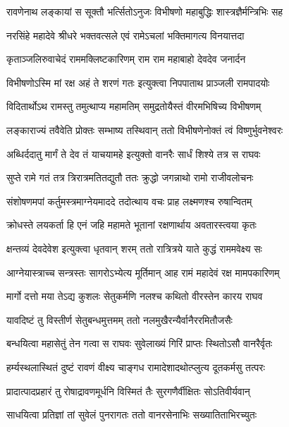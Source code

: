 \twolineshloka
{रावणेनाथ लङ्कायां स सूक्तौ भर्त्सितोऽनुजः}
{विभीषणो महाबुद्धिः शास्त्रज्ञैर्मन्त्रिभिः सह} %

\twolineshloka
{नरसिंहे महादेवे श्रीधरे भक्तवत्सले}
{एवं रामेऽचलां भक्तिमागत्य विनयात्तदा} %

\twolineshloka
{कृताञ्जलिरुवाचेदं राममक्लिष्टकारिणम्}
{राम राम महाबाहो देवदेव जनार्दन} %

\twolineshloka
{विभीषणोऽस्मि मां रक्ष अहं ते शरणं गतः}
{इत्युक्त्वा निपपाताथ प्राञ्जली रामपादयोः} %

\twolineshloka
{विदितार्थोऽथ रामस्तु तमुत्थाप्य महामतिम्}
{समुद्रतोयैस्तं वीरमभिषिच्य विभीषणम्} %

\twolineshloka
{लङ्काराज्यं तवैवेति प्रोक्तः सम्भाष्य तस्थिवान्}
{ततो विभीषणेनोक्तं त्वं विष्णुर्भुवनेश्वरः} %

\twolineshloka
{अब्धिर्ददातु मार्गं ते देव तं याचयामहे}
{इत्युक्तो वानरैः सार्धं शिश्ये तत्र स राघवः} %

\twolineshloka
{सुप्ते रामे गतं तत्र त्रिरात्रमतितद्युतौ}
{ततः क्रुद्धो जगन्नाथो रामो राजीवलोचनः} %

\twolineshloka
{संशोषणमपां कर्तुमस्त्रमाग्नेयमाददे}
{तदोत्थाय वचः प्राह लक्ष्मणश्च रुषान्वितम्} %

\twolineshloka
{क्रोधस्ते लयकर्ता हि एनं जहि महामते}
{भूतानां रक्षणार्थाय अवतारस्त्वया कृतः} %

\twolineshloka
{क्षन्तव्यं देवदेवेश इत्युक्त्वा धृतवान् शरम्}
{ततो रात्रित्रये याते कुद्धं राममवेक्ष्य सः} %

\twolineshloka
{आग्नेयास्त्राच्च सन्त्रस्तः सागरोऽभ्येत्य मूर्तिमान्}
{आह रामं महादेवं रक्ष मामपकारिणम्} %

\twolineshloka
{मार्गो दत्तो मया तेऽद्य कुशलः सेतुकर्मणि}
{नलश्च कथितो वीरस्तेन कारय राघव} %

\twolineshloka
{यावदिष्टं तु विस्तीर्ण सेतुबन्धमुत्तमम्}
{ततो नलमुखैरन्यैर्वानैररमितौजसैः} %

\twolineshloka
{बन्धयित्वा महासेतुं तेन गत्वा स राघवः}
{सुवेलाख्यं गिरिं प्राप्तः स्थितोऽसौ वानरैर्वृतः} %

\twolineshloka
{हर्म्यस्थलास्थितं दुष्टं रावणं वीक्ष्य चाङ्गध}
{रामादेशादथोत्प्लुत्य दूतकर्मसु तत्परः} %

\twolineshloka
{प्रादात्पादप्रहारं तु रोषाद्रावणमूर्धनि}
{विस्मितं तैः सुरगणैर्वीक्षितः सोऽतिवीर्यवान्} %

\twolineshloka
{साधयित्वा प्रतिज्ञां तां सुवेलं पुनरागतः}
{ततो वानरसेनाभिः सख्यातिताभिरच्युतः} %

